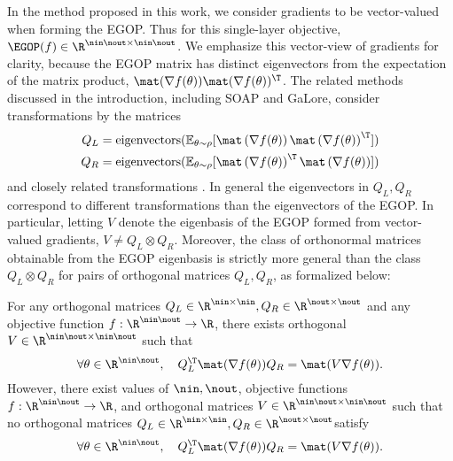     In the method proposed in this work, we consider gradients to be vector-valued when forming the EGOP. Thus for this single-layer objective, $\EGOP(f) \in \R^{\nin\nout \times \nin\nout}$. We emphasize this vector-view of gradients for clarity, because the EGOP matrix has distinct eigenvectors from the expectation of the matrix product, $\mat(\nabla f(\theta))\mat(\nabla f(\theta))^{\T}$. The related methods discussed in the introduction, including SOAP and GaLore, consider transformations by the matrices
    \begin{align*}
        Q_L &= \operatorname{eigenvectors}(\mathbb{E}_{\theta\sim\rho} [\mat\left(\nabla f(\theta)\right)\mat\left(\nabla f(\theta)\right)^{\T}])\\
        Q_R &= \operatorname{eigenvectors}(\mathbb{E}_{\theta\sim\rho} [\mat\left(\nabla f(\theta)\right)^{\T}\mat\left(\nabla f(\theta)\right)])
    \end{align*}
    and closely related transformations \cite{vyas2024soap, zhao2024galore, maes2024understanding}. In general the eigenvectors in $Q_L, Q_R$ correspond to different transformations than the eigenvectors of the EGOP. In particular, letting $V$ denote the eigenbasis of the EGOP formed from vector-valued gradients, $V\neq Q_L\otimes Q_R$. Moreover, the class of orthonormal matrices obtainable from the EGOP eigenbasis is strictly more general than the class $Q_L \otimes Q_R$ for pairs of orthogonal matrices $Q_L, Q_R$, as formalized below:
    \begin{lemma}
        For any orthogonal matrices $Q_L\in\R^{\nin\times \nin},Q_R\in\R^{\nout\times\nout}$ and any objective function $f:\R^{\nin\nout}\rightarrow \R$, there exists orthogonal $V\in \R^{\nin\nout\times\nin\nout}$ such that
        \[
            \forall \theta \in \R^{\nin\nout}, \quad Q_L^\T \mat(\nabla f(\theta)) Q_R = \mat(V\nabla f(\theta)).
        \]
        However, there exist values of $\nin, \nout$, objective functions $f:\R^{\nin\nout}\rightarrow \R$, and orthogonal matrices $V\in \R^{\nin\nout\times \nin\nout}$ such that no orthogonal matrices $Q_L\in\R^{\nin\times \nin},Q_R\in\R^{\nout\times\nout}$satisfy
        \[
            \forall \theta \in \R^{\nin\nout}, \quad Q_L^\T \mat(\nabla f(\theta)) Q_R = \mat(V\nabla f(\theta)).
        \]
    \end{lemma}
